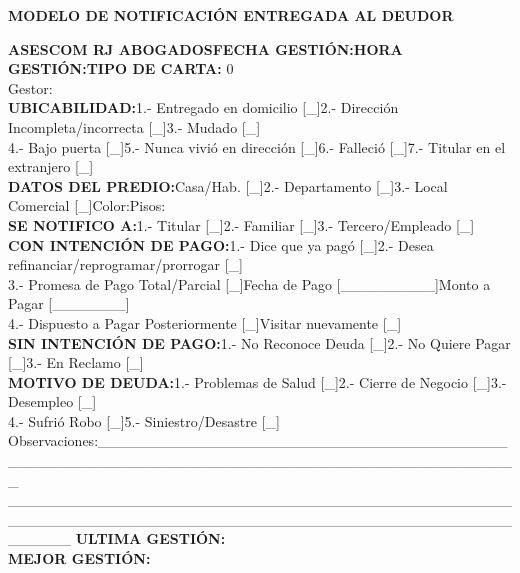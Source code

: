 \begin{center}
\textbf{ MODELO DE NOTIFICACIÓN ENTREGADA AL DEUDOR}
\end{center}
{\noindent
\textbf{ASESCOM RJ ABOGADOS}\hfill \textbf{FECHA GESTIÓN:}\hfill \textbf{HORA GESTIÓN:}\hfill \textbf{TIPO DE CARTA:} {0}\space\\
Gestor:\\
\textbf{UBICABILIDAD:}\hfill 1.- Entregado en domicilio [\_]\hfill 2.- Dirección Incompleta/incorrecta [\_]\hfill 3.- Mudado [\_]\hfill \space\\
4.- Bajo puerta [\_]\hfill 5.- Nunca vivió en dirección [\_]\hfill 6.- Falleció [\_]\hfill 7.- Titular en el extranjero [\_]\hfill \space\\
\textbf{DATOS DEL PREDIO:}\hfill Casa/Hab. [\_]\hfill 2.- Departamento [\_]\hfill 3.- Local Comercial [\_]\hfill Color:\hfill Pisos:\hfill \space\\
\textbf{SE NOTIFICO A:}\hfill 1.- Titular [\_]\hfill 2.- Familiar [\_]\hfill 3.- Tercero/Empleado [\_]\hfill \space\\ 	
\textbf{CON INTENCIÓN DE PAGO:}\hfill 1.- Dice que ya pagó [\_]\hfill 2.- Desea refinanciar/reprogramar/prorrogar [\_]\hfill \space\\
3.- Promesa de Pago Total/Parcial [\_]\hfill Fecha de Pago [\_\_\_\_\_\_\_\_\_]\hfill Monto a Pagar [\_\_\_\_\_\_\_]\hfill \space\\
4.- Dispuesto a Pagar Posteriormente [\_]\hfill Visitar nuevamente [\_]\hfill \space\\
\textbf{SIN INTENCIÓN DE PAGO:}\hfill 1.- No Reconoce Deuda [\_]\hfill 2.- No Quiere Pagar [\_]\hfill 3.- En Reclamo [\_]\hfill \space\\
\textbf{MOTIVO DE DEUDA:}\hfill 1.- Problemas de Salud [\_]\hfill 2.- Cierre de Negocio [\_]\hfill 3.- Desempleo [\_]\hfill \space\\
4.- Sufrió Robo [\_]\hfill 5.- Siniestro/Desastre [\_]\hfill \space\\
Observaciones:\_\_\_\_\_\_\_\_\_\_\_\_\_\_\_\_\_\_\_\_\_\_\_\_\_\_\_\_\_\_\_\_\_\_\_\_\_\_\_\_\_\_\_\_\_\_\_\_\_\_\_\_\_\_\_\_\_\_\_\_\_\_\_\_\_\_\_\_\_\_\_\_\_\_\_\_\_\_\_\_\_\_\_\_\_\_\_\_\\
\_\_\_\_\_\_\_\_\_\_\_\_\_\_\_\_\_\_\_\_\_\_\_\_\_\_\_\_\_\_\_\_\_\_\_\_\_\_\_\_\_\_\_\_\_\_\_\_\_\_\_\_\_\_\_\_\_\_\_\_\_\_\_\_\_\_\_\_\_\_\_\_\_\_\_\_\_\_\_\_\_\_\_\_\_\_\_\_\_\_\_\_\_\_\_\_\_\_\_\_\_\_
\textbf{ULTIMA GESTIÓN:}\\
\textbf{MEJOR GESTIÓN:}
}









